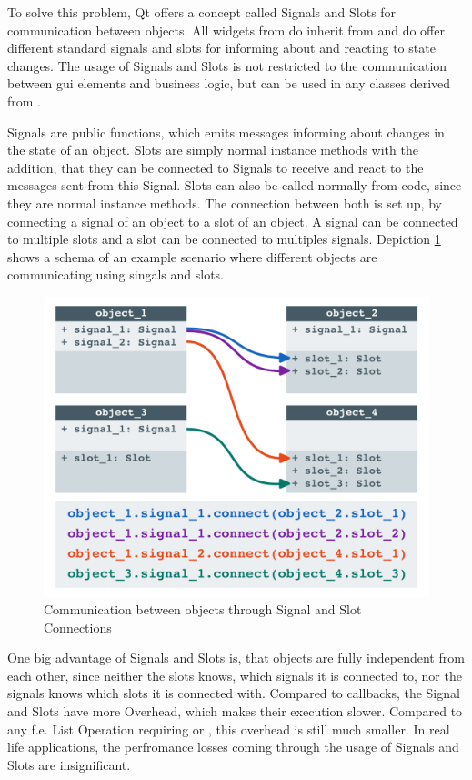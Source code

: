 To solve this problem, Qt offers a concept called Signals and Slots for communication between objects. All widgets from  do inherit from  and do offer different standard signals and slots for informing about and reacting to state changes. The usage of Signals and Slots is not restricted to the communication between \gls{gui} elements and business logic, but can be used in any classes derived from .

Signals are public functions, which emits messages informing about changes in the state of an object. Slots are simply normal instance methods with the addition, that they can be connected to Signals to receive and react to the messages sent from this Signal. Slots can also be called normally from code, since they are normal instance methods. The connection between both is set up, by connecting a signal of an object to a slot of an object. A signal can be connected to multiple slots and a slot can be connected to multiples signals. Depiction \ref{fig:qtSignalsAndSlots} shows a schema of an example scenario where different objects are communicating using singals and slots.

\begin{figure}[h]
    \centering
    \includegraphics[width=12cm]{resources/img/QtSignalsSlots}
    \caption{Communication between objects through Signal and Slot Connections}
    \label{fig:qtSignalsAndSlots}
\end{figure}

One big advantage of Signals and Slots is, that objects are fully independent from each other, since neither the slots knows, which signals it is connected to, nor the signals knows which slots it is connected with. Compared to callbacks, the Signal and Slots have more Overhead, which makes their execution slower. Compared to any f.e. List Operation requiring  or , this overhead is still much smaller. In real life applications, the perfromance losses coming through the usage of Signals and Slots are insignificant.
\cite{QtSignalsAndSlots, PythonGui1}

